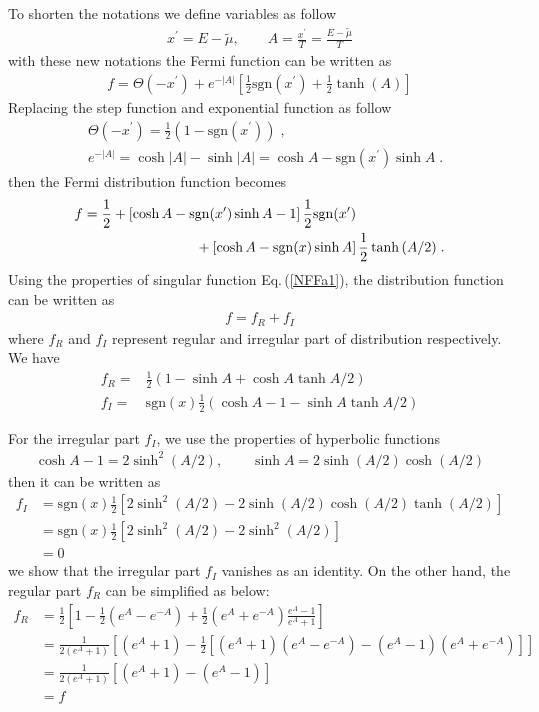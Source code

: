 \documentclass[sn-mathphys,Numbered]{sn-jnl}
\theoremstyle{thmstyleone}%
\theoremstyle{thmstyletwo}%
\theoremstyle{thmstylethree}%
\begin{document}
To shorten the notations we define variables as follow
\begin{align}
x^\prime=E-\tilde\mu,\qquad A = \frac{x^\prime}{T}= \frac{E-\tilde\mu}{T}
\end{align}
with these new notations the Fermi function can be written as
\begin{align}
f=\Theta(-x^\prime)+e^{-|A|}\left[\frac{1}{2}\mathrm{sgn}\left(x^\prime\right) 
 +\frac{1}{2}\tanh\left(A\right)\right]
\end{align}
Replacing the step function and exponential function as  follow
 \begin{align}\label{NFF4}
&\Theta(-x^\prime)=\frac 1 2 (1-\mathrm{sgn}(x^\prime))\;,\\ 
&e^{-|A|}=\cosh|A|-\sinh|A|=\cosh A- \mathrm{sgn}(x^\prime)\sinh A\;.
\end{align}
then the Fermi distribution function becomes
\begin{align}
f=\frac{1}{2} &+\left[\cosh {A}- \mathrm{sgn}(x^\prime)\sinh{A} -1\right]\frac{1}{2} \mathrm{sgn}(x^\prime)\notag\\
 &\qquad\qquad\qquad+\left[\cosh{A}- \mathrm{sgn}(x)\sinh{A} \right]\frac{1}{2}\tanh{(A/2)}\;.
\end{align}
Using the properties of singular function  Eq.\,(\ref{NFFa1}), the distribution function can be written as
\begin{align}
f=f_R+f_I
\end{align}
where $f_R$ and $f_I$ represent regular and irregular part of distribution respectively. We have
\begin{align}\label{NFF5a}
 f_R=& \frac{1}{2}\left(1-\sinh A +\cosh A \tanh A/2\right) \\
 f_I=& \mathrm{sgn}(x) \frac{1}{2} \left(\cosh A-1 - \sinh A \tanh A/2\right)
 \label{NFF5b}
\end{align}

For the irregular part $f_I$, we use the properties of hyperbolic functions
\begin{align}
\cosh A-1= 2\sinh^2(A/2), \qquad\sinh A=2 \sinh(A/2) \cosh(A/2)
\end{align}
then it can be written as
\begin{align}
f_I&=\mathrm{sgn}(x) \frac{1}{2} \left[ 2\sinh^2(A/2) - 2 \sinh(A/2) \cosh(A/2) \tanh (A/2)\right]\\
&=\mathrm{sgn}(x) \frac{1}{2}\left[2\sinh^2(A/2)-2\sinh^2(A/2)\right]\\
&=0
\end{align}
we show that the irregular part $f_I$ vanishes as an identity. On the other hand, the regular part $f_R$ can be simplified as below:
\begin{align}
f_R&=\frac{1}{2}\left[1-\frac{1}{2}\left(e^A-e^{-A}\right)+\frac{1}{2}\left(e^A+e^{-A}\right)\frac{e^A-1}{e^A+1}\right]\\
&=\frac{1}{2(e^A+1)}\left[\left(e^A+1\right)-\frac{1}{2}\left[\left(e^A+1\right)\left(e^A-e^{-A}\right)-\left(e^A-1\right)\left(e^A+e^{-A}\right)\right]\right]\\
&=\frac{1}{2(e^A+1)}\left[\left(e^A+1\right)-\left(e^A-1\right)\right]\\
&=f
\end{align}
\end{document}
